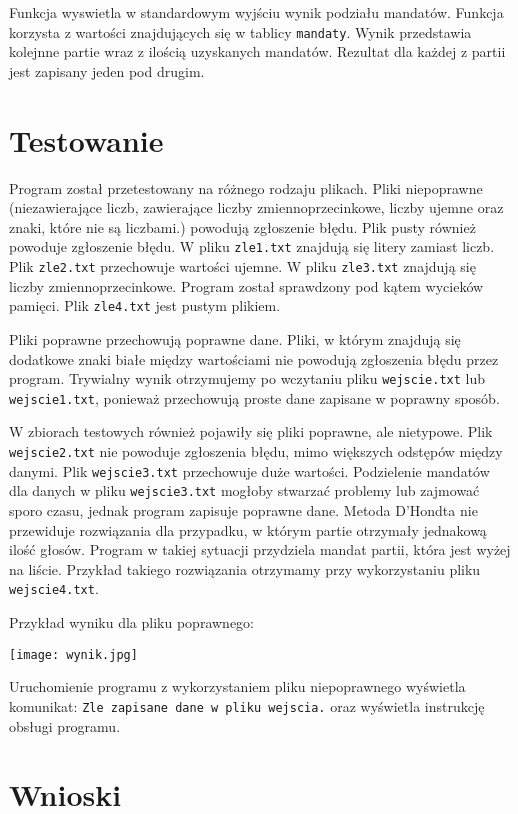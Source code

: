 \documentclass[12pt,a4paper]{article}
\begin{document}
Funkcja wyswietla w standardowym wyjściu wynik podziału mandatów. Funkcja korzysta z wartości znajdujących się w tablicy \texttt{mandaty}. Wynik przedstawia kolejnne partie wraz z ilością uzyskanych mandatów. Rezultat dla każdej z partii jest zapisany jeden pod drugim.


\section{Testowanie}

Program został przetestowany na różnego rodzaju plikach. Pliki niepoprawne (niezawierające liczb, zawierające liczby zmiennoprzecinkowe, liczby ujemne oraz znaki, które nie są liczbami.) powodują zgłoszenie błędu. Plik pusty również powoduje zgłoszenie błędu. W pliku \texttt{zle1.txt} znajdują się litery zamiast liczb. Plik \texttt{zle2.txt} przechowuje wartości ujemne. W pliku \texttt{zle3.txt} znajdują się liczby zmiennoprzecinkowe. 
Program został sprawdzony pod kątem wycieków pamięci. Plik \texttt{zle4.txt} jest pustym plikiem.

Pliki poprawne przechowują poprawne dane. Pliki, w którym znajdują się dodatkowe znaki białe między wartościami nie powodują zgłoszenia błędu przez program. Trywialny wynik otrzymujemy po wczytaniu pliku \texttt{wejscie.txt} lub \texttt{wejscie1.txt}, ponieważ przechowują proste dane zapisane w poprawny sposób. 

W zbiorach testowych również pojawiły się pliki poprawne, ale nietypowe.
Plik \texttt{wejscie2.txt} nie powoduje zgłoszenia błędu, mimo większych odstępów między danymi. Plik \texttt{wejscie3.txt} przechowuje duże wartości. Podzielenie mandatów dla danych w pliku \texttt{wejscie3.txt} mogłoby stwarzać problemy lub zajmować sporo czasu, jednak program zapisuje poprawne dane.   
Metoda D'Hondta nie przewiduje rozwiązania dla przypadku, w którym partie otrzymały jednakową ilość głosów. Program w takiej sytuacji przydziela mandat partii, która jest wyżej na liście. Przykład takiego rozwiązania otrzymamy przy wykorzystaniu pliku \texttt{wejscie4.txt}. 

Przykład wyniku dla pliku poprawnego:

\texttt{[image: wynik.jpg]}

Uruchomienie programu z wykorzystaniem pliku niepoprawnego wyświetla komunikat: \texttt{Zle zapisane dane w pliku wejscia.} oraz wyświetla instrukcję obsługi programu.


\section{Wnioski}
\end{document}
